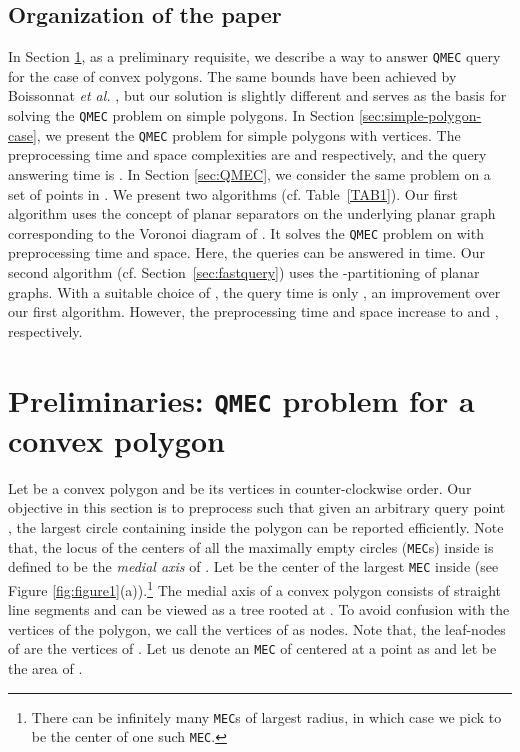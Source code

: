 \documentclass[12pt]{llncs}
\begin{document}
\subsection{Organization of the paper}
In Section \ref{sec:Convex}, as a preliminary requisite, we describe a way to answer {\tt QMEC} query for the case of convex polygons. The same bounds have been achieved by  Boissonnat {\it et al.} 
\cite{BCOY01}, but
our solution is slightly different and serves as the basis for solving the {\tt QMEC} problem on simple 
polygons. In Section \ref{sec:simple-polygon-case}, 
we present the {\tt QMEC} problem for simple polygons with  vertices. The preprocessing 
time and space complexities are  and  respectively, 
and the query answering time is . In Section \ref{sec:QMEC}, we 
consider the same problem on  a set  of  points in . We present 
two algorithms (cf. Table\ \ref{TAB1}). Our first algorithm uses the 
concept of planar separators \cite{LT79} on the underlying planar graph corresponding to 
the  Voronoi  diagram of  . It solves the {\tt QMEC} 
problem  on  with  preprocessing time 
and  space. Here, the queries can be answered in  time. Our second algorithm (cf. Section\ \ref{sec:fastquery}) uses the -partitioning \cite{fed} of planar graphs. With a suitable 
choice of
, the query time is only , an improvement over our first algorithm. However, the preprocessing time 
and 
space increase
to   and , respectively. 

\section{Preliminaries: {\tt QMEC} problem for a convex polygon}
 \label{sec:Convex}


Let  be a convex polygon and  be its
vertices in counter-clockwise order. Our objective in this section is to preprocess
 such that given an arbitrary query point , the largest
circle  containing  inside the polygon  can be reported 
efficiently. Note that, the locus of the centers of all the maximally empty circles ({\tt MEC}s) 
inside  is defined to be the {\em medial axis}  of . Let  be the center of 
the largest {\tt MEC} inside  (see Figure \ref{fig:figure1}(a)).\footnote{There can be 
infinitely many {\tt MEC}s of largest radius, in which case we pick 
 to be the center of one such {\tt MEC}.} The medial 
axis of a convex polygon consists of straight line
segments and can be viewed as a tree rooted at  \cite{CSW99}. To
avoid  confusion with the vertices of the polygon, we call the
vertices of  as nodes. Note that, the leaf-nodes of  are the
vertices of . Let us denote an {\tt MEC}  of  centered at a point  as  and let  be the area of . 
\end{document}
